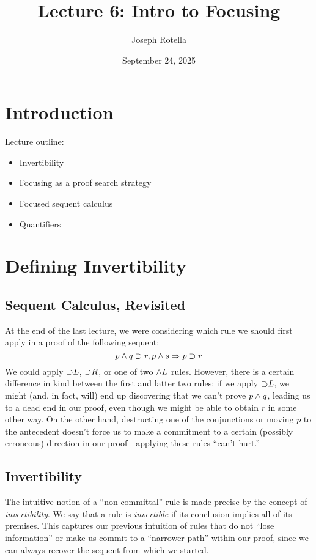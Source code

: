 \documentclass{article}
\title{Lecture 6: Intro to Focusing}
\author{Joseph Rotella}
\date{September 24, 2025}
\begin{document}
\maketitle

\section{Introduction}

Lecture outline:
\begin{itemize}
    \item Invertibility
    \item Focusing as a proof search strategy
    \item Focused sequent calculus
    \item Quantifiers
\end{itemize}

\section{Defining Invertibility}

\subsection{Sequent Calculus, Revisited}

At the end of the last lecture, we were considering which rule we should first apply in a proof of
the following sequent:
\begin{equation}
  \label{eq:6-multi-choice}
  p \wedge q \supset r, p \wedge s \Rightarrow p \supset r
\end{equation} 
We could apply ${\supset} L$, ${\supset} R$, or one of two ${\wedge} L$ rules. However, there is a certain
difference in kind between the first and latter two rules: if we apply ${\supset} L$, we might (and,
in fact, will) end up discovering that we can't prove $p \wedge q$, leading us to a dead end in our
proof, even though we might be able to obtain $r$ in some other way. On the other hand, destructing
one of the conjunctions or moving $p$ to the antecedent doesn't force us to make a commitment to a
certain (possibly erroneous) direction in our proof---applying these rules ``can't hurt.''

\subsection{Invertibility}

The intuitive notion of a ``non-committal'' rule is made precise by the concept of
\emph{invertibility}. We say that a rule is \emph{invertible} if its conclusion implies all of its
premises. This captures our previous intuition of rules that do not ``lose information'' or make us
commit to a ``narrower path'' within our proof, since we can always recover the sequent from which
we started.
\end{document}
